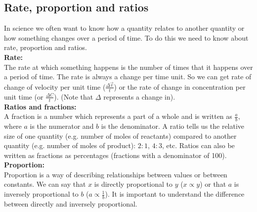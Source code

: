 \subsection*{Rate, proportion and ratios}
In science we often want to know how a quantity relates to another quantity or how something changes over a period of time. To do this we need to know about rate, proportion and ratios. \\
\textbf{Rate:}\\
The rate at which something happens is the number of times that it happens over a period of time. The rate is always a change per time unit. So we can get rate of change of velocity per unit time ($\frac{\Delta \vec{v}}{t}$) or the rate of change in concentration per unit time (or $\frac{\Delta{C}}{t}$). (Note that $\Delta$ represents a change in). \\
\textbf{Ratios and fractions:}\\
A fraction is a number which represents a part of a whole and is written as $\frac{a}{b}$, where $a$ is the numerator and $b$ is the denominator. A ratio tells us the relative size of one quantity (e.g. number of moles of reactants) compared to another quantity (e.g. number of moles of product): $2:1$, $4:3$, etc. Ratios can also be written as fractions as percentages (fractions with a denominator of 100). \\
\textbf{Proportion:}\\
Proportion is a way of describing relationships between values or between constants. We can say that $x$ is directly proportional to $y$ ($x \propto y$) or that $a$ is inversely proportional to $b$ ($a \propto \frac{1}{b}$). It is important to understand the difference between directly and inversely proportional.
